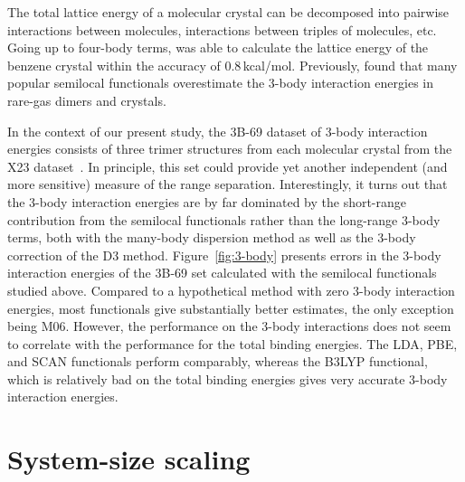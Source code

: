 The total lattice energy of a molecular crystal can be decomposed into pairwise interactions between molecules, interactions between triples of molecules, etc.
Going up to four-body terms, \citet{YangS14} was able to calculate the lattice energy of the benzene crystal within the accuracy of 0.8\,kcal/mol.
Previously, \citet{TkatchenkoPRB08} found that many popular semilocal functionals overestimate the 3-body interaction energies in rare-gas dimers and crystals.

In the context of our present study, the 3B-69 dataset of 3-body interaction energies consists of three trimer structures from each molecular crystal from the X23 dataset~\cite{RezacJCTC15}.
In principle, this set could provide yet another independent (and more sensitive) measure of the range separation.
Interestingly, it turns out that the 3-body interaction energies are by far dominated by the short-range contribution from the semilocal functionals rather than the long-range 3-body terms, both with the many-body dispersion method as well as the 3-body correction of the D3 method.
Figure~\ref{fig:3-body} presents errors in the 3-body interaction energies of the 3B-69 set calculated with the semilocal functionals studied above.
Compared to a hypothetical method with zero 3-body interaction energies, most functionals give substantially better estimates, the only exception being M06.
However, the performance on the 3-body interactions does not seem to correlate with the performance for the total binding energies.
The LDA, PBE, and SCAN functionals perform comparably, whereas the B3LYP functional, which is relatively bad on the total binding energies gives very accurate 3-body interaction energies.

\section{System-size scaling}

